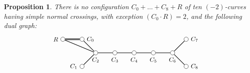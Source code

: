 \documentclass[oneside, 12pt]{amsart}
\newcommand\mylabel[1]{\label{#1}\marginpar{\vspace{-1ex}\medskip\medskip\footnotesize \tt #1}}
\renewcommand\mylabel[1]{\label{#1}}
\newtheorem{proposition}[theorem]{Proposition}
\theoremstyle{definition}
\theoremstyle{remark}
\begin{document}
\begin{proposition}
\mylabel{no I4*+R second}
There is no configuration $C_0+\ldots+C_8+R$ of ten $(-2)$-curves 
having    simple normal crossings, with   exception  $(C_0\cdot R)=2$, and the following dual graph:
\begin{equation}
\label{I4*+R second}
\begin{gathered}
\begin{tikzpicture}
[node distance=1cm, font=\small]
\tikzstyle{vertex}=[circle, draw, fill=white, inner sep=0mm, minimum size=1.5ex]
\node[vertex]	(C2)  	at (1,0) 	[label=below:{$C_2$}] 		{};
\node[vertex]	(C3)			[right of=C2, label=below:{$C_3$}]	{};
\node[vertex]	(C4)			[right of=C3, label=below:{$C_4$}]	{};
\node[vertex]	(C5)			[right of=C4, label=below:{$C_5$}]	{};
\node[vertex]	(C6)			[right of=C5, label=below:{$C_6$}]	{};

\node[vertex]	(C7)			[above right of=C6, label=right:{$C_7$}]	{};
\node[vertex]	(C8)			[below right of=C6, label=right:{$C_8$}]	{};
\node[vertex]	(C0)			[above left  of=C2, label=right :{$C_0$}]	{};
\node[vertex]	(C1)			[below left  of=C2, label=left :{$C_1$}]	{};
\node[vertex]	(R)			[left of=C0, label=left:{$R$}]	{};

\draw [thick] (C2)--(C3)--(C4)--(C5)--(C6);
\draw [thick] (C0)--(C2)--(C1);
\draw [thick] (C7)--(C6)--(C8);
\draw [thick,double] (C0)--(R);
\draw [thick] (C2)--(R);
\end{tikzpicture}
\end{gathered}
\end{equation}
\end{proposition}
\end{document}
